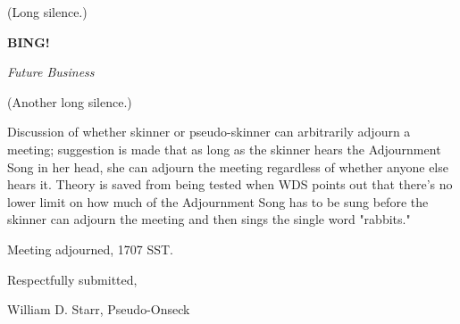 \documentclass[12pt]{article}
\newcommand{\bing}{{\bf BING!} }
\newcommand{\goto}[1]{\bing \vskip 12pt \centerline{{\em{#1}}}}
\begin{document}
(Long silence.)

\goto{Future Business}

(Another long silence.)

Discussion of whether skinner or pseudo-skinner can arbitrarily adjourn a meeting; suggestion is made that as long as the skinner hears the Adjournment Song in her head, she can adjourn the meeting regardless of whether anyone else hears it. Theory is saved from being tested when WDS points out that there's no lower limit on how much of the Adjournment Song has to be sung before the skinner can adjourn the meeting and then sings the single word "rabbits."

\vspace{12pt}

\noindent
Meeting adjourned, 1707 SST.

\vspace{18pt}

\centerline{Respectfully submitted,}
\centerline{William D. Starr, Pseudo-Onseck}
\end{document}
